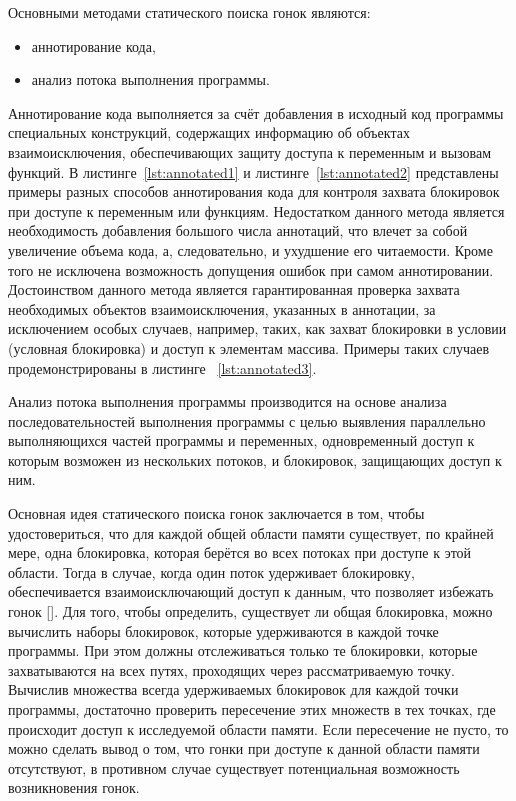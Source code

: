 Основными методами статического поиска гонок являются:

\begin{itemize}
  \item аннотирование кода,
  \item анализ потока выполнения программы.
\end{itemize}

Аннотирование кода выполняется за счёт добавления в исходный код программы специальных конструкций, содержащих информацию об объектах взаимоисключения, обеспечивающих защиту доступа к переменным и вызовам функций. В листинге~\ref{lst:annotated1} и листинге~\ref{lst:annotated2} представлены примеры разных способов аннотирования кода для контроля захвата блокировок при доступе к переменным или функциям. Недостатком данного метода является необходимость добавления большого числа аннотаций, что влечет за собой увеличение объема кода, а, следовательно, и ухудшение его читаемости. Кроме того не исключена возможность допущения ошибок при самом аннотировании. Достоинством данного метода является гарантированная проверка захвата необходимых объектов взаимоисключения, указанных в аннотации, за исключением особых случаев, например, таких, как захват блокировки в условии (условная блокировка) и доступ к элементам массива. Примеры таких случаев продемонстрированы в листинге ~\ref{lst:annotated3}.







Анализ потока выполнения программы производится на основе анализа последовательностей выполнения программы с целью выявления параллельно выполняющихся частей программы и переменных, одновременный доступ к которым возможен из нескольких потоков, и блокировок, защищающих доступ к ним.

Основная идея статического поиска гонок заключается в том, чтобы удостовериться, что для каждой общей области памяти существует, по крайней мере, одна блокировка, которая берётся во всех потоках при доступе к этой области. Тогда в случае, когда один поток удерживает блокировку, обеспечивается взаимоисключающий доступ к данным, что позволяет избежать гонок []. Для того, чтобы определить, существует ли общая блокировка, можно вычислить наборы блокировок, которые удерживаются в каждой точке программы. При этом должны отслеживаться только те блокировки, которые захватываются на всех путях, проходящих через рассматриваемую точку. Вычислив множества всегда удерживаемых блокировок для каждой точки программы, достаточно проверить пересечение этих множеств в тех точках, где происходит доступ к исследуемой области памяти. Если пересечение не пусто, то можно сделать вывод о том, что гонки при доступе к данной области памяти отсутствуют, в противном случае существует потенциальная возможность возникновения гонок.

